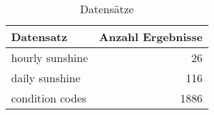 \begin{table}[t]
    \caption{Datensätze}
    \label{Datensaetze}
    \centering
    \small
    \begin{tabular}{l r}
        \toprule
        Datensatz & Anzahl Ergebnisse\\
        \midrule
        hourly sunshine & 26\\
        daily sunshine & 116\\
        condition codes & 1886\\
        \bottomrule
    \end{tabular}
\end{table}